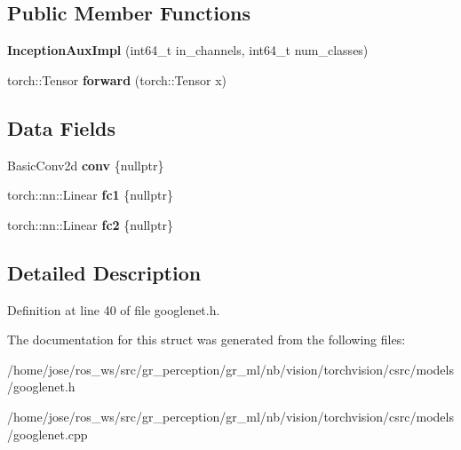 \subsection*{Public Member Functions}
\begin{DoxyCompactItemize}
\item 
\mbox{\label{structvision_1_1models_1_1__googlenetimpl_1_1InceptionAuxImpl_a1b14f5f290e9e97d76b53f58cb19ed3a}} 
{\bfseries Inception\+Aux\+Impl} (int64\+\_\+t in\+\_\+channels, int64\+\_\+t num\+\_\+classes)
\item 
\mbox{\label{structvision_1_1models_1_1__googlenetimpl_1_1InceptionAuxImpl_a7e5383739b435c673476f0a67f6f0deb}} 
torch\+::\+Tensor {\bfseries forward} (torch\+::\+Tensor x)
\end{DoxyCompactItemize}
\subsection*{Data Fields}
\begin{DoxyCompactItemize}
\item 
\mbox{\label{structvision_1_1models_1_1__googlenetimpl_1_1InceptionAuxImpl_a49bfcd890266d1a967c385692e5b4b94}} 
Basic\+Conv2d {\bfseries conv} \{nullptr\}
\item 
\mbox{\label{structvision_1_1models_1_1__googlenetimpl_1_1InceptionAuxImpl_a6662f05193bc270fb97e8fb561d1cb54}} 
torch\+::nn\+::\+Linear {\bfseries fc1} \{nullptr\}
\item 
\mbox{\label{structvision_1_1models_1_1__googlenetimpl_1_1InceptionAuxImpl_a6ff6ff1a0de12b678867b17f02f774c4}} 
torch\+::nn\+::\+Linear {\bfseries fc2} \{nullptr\}
\end{DoxyCompactItemize}


\subsection{Detailed Description}


Definition at line 40 of file googlenet.\+h.



The documentation for this struct was generated from the following files\+:\begin{DoxyCompactItemize}
\item 
/home/jose/ros\+\_\+ws/src/gr\+\_\+perception/gr\+\_\+ml/nb/vision/torchvision/csrc/models/googlenet.\+h\item 
/home/jose/ros\+\_\+ws/src/gr\+\_\+perception/gr\+\_\+ml/nb/vision/torchvision/csrc/models/googlenet.\+cpp\end{DoxyCompactItemize}
